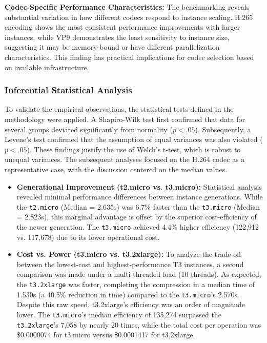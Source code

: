 \documentclass[conference]{IEEEtran}
\begin{document}
	\textbf{Codec-Specific Performance Characteristics:} The benchmarking reveals substantial variation in how different codecs respond to instance scaling. H.265 encoding shows the most consistent performance improvements with larger instances, while VP9 demonstrates the least sensitivity to instance size, suggesting it may be memory-bound or have different parallelization characteristics. This finding has practical implications for codec selection based on available infrastructure.
	
	\subsubsection{Inferential Statistical Analysis}
	
	To validate the empirical observations, the statistical tests defined in the methodology were applied. A Shapiro-Wilk test first confirmed that data for several groups deviated significantly from normality ($p < .05$). Subsequently, a Levene's test confirmed that the assumption of equal variances was also violated ($p < .05$). These findings justify the use of Welch's t-test, which is robust to unequal variances. The subsequent analyses focused on the H.264 codec as a representative case, with the discussion centered on the median values.
	
	\begin{itemize}
		\item \textbf{Generational Improvement (t2.micro vs. t3.micro):} Statistical analysis revealed minimal performance differences between instance generations. While the \texttt{t2.micro} (Median = 2.635s) was 6.7\% faster than the \texttt{t3.micro} (Median = 2.823s), this marginal advantage is offset by the superior cost-efficiency of the newer generation. The \texttt{t3.micro} achieved 4.4\% higher efficiency (122,912 vs. 117,678) due to its lower operational cost.
		
		\item \textbf{Cost vs. Power (t3.micro vs. t3.2xlarge):} To analyze the trade-off between the lowest-cost and highest-performance T3 instances, a second comparison was made under a multi-threaded load (10 threads). As expected, the \texttt{t3.2xlarge} was faster, completing the compression in a median time of 1.530s (a 40.5\% reduction in time) compared to the \texttt{t3.micro}'s 2.570s. Despite this raw speed, t3.2xlarge's efficiency was an order of magnitude lower. The \texttt{t3.micro}'s median efficiency of 135,274 surpassed the \texttt{t3.2xlarge}'s 7,058 by nearly 20 times, while the total cost per operation was \$0.0000074 for t3.micro versus \$0.0001417 for t3.2xlarge.
	\end{itemize}
	
\end{document}
